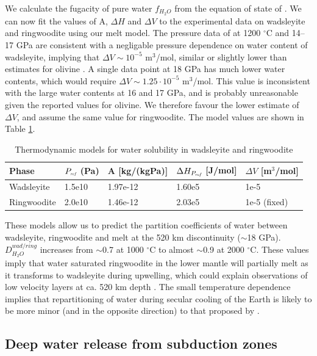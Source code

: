 \documentclass[review]{elsarticle}
\begin{document}
We calculate the fugacity of pure water $f_{H_2O}$ from the equation of state of \citep{PS1995}. We can now fit the values of A, $\Delta H$ and $\Delta V$ to the experimental data on wadsleyite and ringwoodite using our melt model. The pressure data of \cite{DDFK2005} at 1200 $^{\circ}$C and 14--17 GPa are consistent with a negligable pressure dependence on water content of wadsleyite, implying that $\Delta V \sim 10^{-5}$ m$^3$/mol, similar or slightly lower than estimates for olivine \citep[1.00 -- 1.06 $\cdot 10^{-5}$ m$^3$/mol][]{KKR1996, ZGK2004, MDAR2006}. A single data point at 18 GPa has much lower water contents, which would require $\Delta V \sim 1.25 \cdot 10^{-5}$ m$^3$/mol. This value is inconsistent with the large water contents at 16 and 17 GPa, and is probably unreasonable given the reported values for olivine. We therefore favour the lower estimate of $\Delta V$, and assume the same value for ringwoodite. The model values are shown in Table \ref{table:partitioning}.

\begin{table}[]
\centering
\caption{Thermodynamic models for water solubility in wadsleyite and ringwoodite}
\label{table:partitioning}
\begin{tabular}{lllll}
Phase & $P_{\textit{\tiny{ref}}}$ (Pa) & A [kg/(kgPa)] & $\Delta H_{P_{\textit{\tiny{ref}}}}$ [J/mol] & $\Delta V$ [m$^3$/mol] \\
\hline
Wadsleyite & 1.5e10 & 1.97e-12 & 1.60e5 & 1e-5 \\
Ringwoodite & 2.0e10 & 1.46e-12 & 2.03e5 & 1e-5 (fixed) \\
\end{tabular}
\end{table}


These models allow us to predict the partition coefficients of water between wadsleyite, ringwoodite and melt at the 520 km discontinuity ($\sim$18 GPa). $D^{wad/ring}_{H_2O}$ increases from $\sim$0.7 at 1000 $^{\circ}$C to almost $\sim$0.9 at 2000 $^{\circ}$C. These values imply that water saturated ringwoodite in the lower mantle will partially melt as it transforms to wadsleyite during upwelling, which could explain observations of low velocity layers at ca. 520 km depth \citep[e.g.][]{JDH2010}. The small temperature dependence implies that repartitioning of water during secular cooling of the Earth is likely to be more minor (and in the opposite direction) to that proposed by \cite{DDFK2005}. 



\subsection{Deep water release from subduction zones}
\cite{MF2010}
\cite{BK2003}
\cite{MSK2008}
\end{document}
